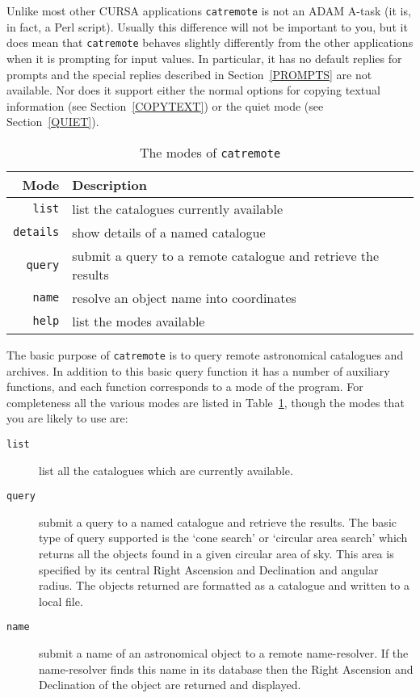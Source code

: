 \documentclass[twoside,11pt]{starlink}
\begin{document}
Unlike most other CURSA applications \texttt{catremote} is not an ADAM
A-task (it is, in fact, a Perl script).  Usually this difference will
not be important to you, but it does mean that \texttt{catremote} behaves
slightly differently from the other applications when it is prompting for
input values.  In particular, it has no default replies for prompts and
the special replies described in Section~\ref{PROMPTS} are not available.
Nor does it support either the normal options for copying textual
information (see Section~\ref{COPYTEXT}) or the quiet mode (see
Section~\ref{QUIET}).

\begin{table}[htbp]

\begin{center}
\begin{tabular}{rl}
Mode          &  Description \\ \hline
\texttt{list}    & list the catalogues currently available \\
\texttt{details} & show details of a named catalogue \\
\texttt{query}   & submit a query to a remote catalogue and retrieve the results \\
\texttt{name}    & resolve an object name into coordinates \\
\texttt{help}    & list the modes available \\
\end{tabular}
\end{center}

\caption{The modes of \texttt{catremote}
\label{MODES} }

\end{table}

The basic purpose of \texttt{catremote} is to query remote astronomical
catalogues and archives.  In addition to this basic query function it has
a number of auxiliary functions, and each function corresponds to a mode
of the program.  For completeness all the various modes are listed in
Table~\ref{MODES}, though the modes that you are likely to use are:

\begin{description}

  \item[\texttt{list}] list all the catalogues which are currently available.

  \item[\texttt{query}] submit a query to a named catalogue and retrieve the
   results.  The basic type of query supported is the `cone search' or
   `circular area search' which returns all the objects found in a given
   circular area of sky.  This area is specified by its central Right
   Ascension and Declination and angular radius.  The objects returned are
   formatted as a catalogue and written to a local file.

  \item[\texttt{name}] submit a name of an astronomical object to a remote
   name-resolver.  If the name-resolver finds this name in its database
   then the Right Ascension and Declination of the object are returned and
   displayed.

\end{description}
\end{document}
